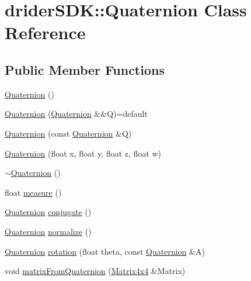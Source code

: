 \hypertarget{classdrider_s_d_k_1_1_quaternion}{}\section{drider\+S\+DK\+:\+:Quaternion Class Reference}
\label{classdrider_s_d_k_1_1_quaternion}
\subsection*{Public Member Functions}
\begin{DoxyCompactItemize}
\item 
\hyperlink{classdrider_s_d_k_1_1_quaternion_ae022b897e4f962cf3a7f5a155ad01234}{Quaternion} ()
\item 
\hyperlink{classdrider_s_d_k_1_1_quaternion_a644b649dee7047182a31d10d087062ca}{Quaternion} (\hyperlink{classdrider_s_d_k_1_1_quaternion}{Quaternion} \&\&Q)=default
\item 
\hyperlink{classdrider_s_d_k_1_1_quaternion_ad90008123c45fcdf2a92ba25028101dd}{Quaternion} (const \hyperlink{classdrider_s_d_k_1_1_quaternion}{Quaternion} \&Q)
\item 
\hyperlink{classdrider_s_d_k_1_1_quaternion_a9b9b7fe9fbfbf24c911dbd6ca7ff2df2}{Quaternion} (float x, float y, float z, float w)
\item 
\hyperlink{classdrider_s_d_k_1_1_quaternion_a5ab8ae4293dfd405fc11c4a0114209b4}{$\sim$\+Quaternion} ()
\item 
float \hyperlink{classdrider_s_d_k_1_1_quaternion_af549c85e1b2e1a67668a193cf66da927}{measure} ()
\item 
\hyperlink{classdrider_s_d_k_1_1_quaternion}{Quaternion} \hyperlink{classdrider_s_d_k_1_1_quaternion_aa2f2f19f27b36910669f84acb1e88f8f}{conjugate} ()
\item 
\hyperlink{classdrider_s_d_k_1_1_quaternion}{Quaternion} \hyperlink{classdrider_s_d_k_1_1_quaternion_afd671db56c3cd55b0d543e96b8e690ef}{normalize} ()
\item 
\hyperlink{classdrider_s_d_k_1_1_quaternion}{Quaternion} \hyperlink{classdrider_s_d_k_1_1_quaternion_a892aa4383f2070ef76b549705b8905cb}{rotation} (float theta, const \hyperlink{classdrider_s_d_k_1_1_quaternion}{Quaternion} \&A)
\item 
void \hyperlink{classdrider_s_d_k_1_1_quaternion_a2fd752f214ccf84e6bdad3c7a21f0e7f}{matrix\+From\+Quaternion} (\hyperlink{classdrider_s_d_k_1_1_matrix4x4}{Matrix4x4} \&Matrix)
\item 

\end{DoxyCompactItemize}
